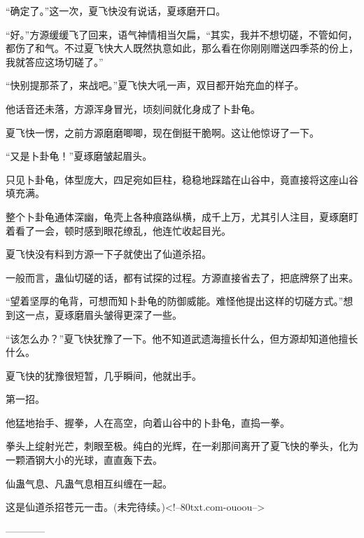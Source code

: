 \begin{this_body}
“确定了。”这一次，夏飞快没有说话，夏琢磨开口。

“好。”方源缓缓飞了回来，语气神情相当欠扁，“其实，我并不想切磋，不管如何，都伤了和气。不过夏飞快大人既然执意如此，那么看在你刚刚赠送四季茶的份上，我就答应这场切磋了。”

“快别提那茶了，来战吧。”夏飞快大吼一声，双目都开始充血的样子。

他话音还未落，方源浑身冒光，顷刻间就化身成了卜卦龟。

夏飞快一愣，之前方源磨磨唧唧，现在倒挺干脆啊。这让他惊讶了一下。

“又是卜卦龟！”夏琢磨皱起眉头。

只见卜卦龟，体型庞大，四足宛如巨柱，稳稳地踩踏在山谷中，竟直接将这座山谷填充满。

整个卜卦龟通体深幽，龟壳上各种痕路纵横，成千上万，尤其引人注目，夏琢磨盯着看了一会，顿时感到眼花缭乱，他连忙收起目光。

夏飞快没有料到方源一下子就使出了仙道杀招。

一般而言，蛊仙切磋的话，都有试探的过程。方源直接省去了，把底牌祭了出来。

“望着坚厚的龟背，可想而知卜卦龟的防御威能。难怪他提出这样的切磋方式。”想到这一点，夏琢磨眉头皱得更深了一些。

“该怎么办？”夏飞快犹豫了一下。他不知道武遗海擅长什么，但方源却知道他擅长什么。

夏飞快的犹豫很短暂，几乎瞬间，他就出手。

第一招。

他猛地抬手、握拳，人在高空，向着山谷中的卜卦龟，直捣一拳。

拳头上绽射光芒，刺眼至极。纯白的光辉，在一刹那间离开了夏飞快的拳头，化为一颗酒钢大小的光球，直直轰下去。

仙蛊气息、凡蛊气息相互纠缠在一起。

这是仙道杀招苍元一击。(未完待续。)<!--80txt.com-ouoou-->

------------

\end{this_body}

